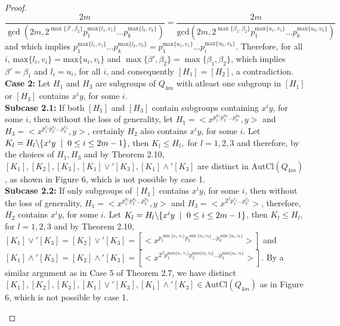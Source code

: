 \documentclass{article}
\theoremstyle{definition}
\begin{document}
\begin{proof}
\begin{equation*}
\frac{2m}{\gcd(2m, 2^{\max\{\beta',\beta_2\}}p_1^{\text{max}\{l_1,v_1\}}\dots p_k^{\text{max}\{l_k,v_k\}}   )}=\frac{2m}{\text{gcd}(2m, 2^{\max\{\beta_1,\beta_2\}}p_1^{\text{max}\{u_1,v_1\}}\dots p_k^{\text{max}\{u_k,v_k\}})}
\end{equation*}
and which implies $p_1^{\text{max}\{l_1,v_1\}}\dots p_k^{\text{max}\{l_k,v_k\}}=p_1^{\text{max}\{u_1,v_1\}}\dots p_i^{\text{max}\{u_k,v_k\}}$. Therefore, for all $i$, $\text{max}\{l_i,v_i\}=\text{max}\{u_i,v_i\}$ and $\max\{\beta',\beta_2\}=\max\{\beta_1,\beta_2\}$, which implies $\beta'=\beta_1$ and $l_i=u_i$, for all $i$, and consequently $[H_1]=[H_2]$, a contradiction. \vspace{0.2cm} \\
\textbf{Case 2:} Let $H_1$ and $H_3$ are subgroups of $Q_{4m}$ with atleast one subgroup in $[H_1]$ or $[H_3]$ contains $x^iy$, for some $i$. \vspace{0.2cm}\\
\textbf{Subcase 2.1:} If both $[H_1]$ and $[H_3]$ contain subgroups containing $x^iy$, for some $i$, then without the loss of generality, let $H_1=\bigl<x^{p_1^{u_1}p_2^{u_2}\dots p_k^{u_k}},y\bigr>$ and $H_3=\bigl<x^{p_1^{v_1}p_2^{v_2}\dots p_k^{v_k}},y\bigr>$, certainly $H_2$ also contains $x^iy$, for some $i$. Let $K_l=H_l\backslash\{x^iy\hspace{0.2cm}|\hspace{0.2cm}0\le i \le 2m-1\}$, then $K_l \le H_l,$ for $l=1,2,3$ and therefore, by the choices of $H_1,H_3$ and by Theorem 2.10, $[K_1], [K_2],[K_3],[K_1]\vee' [K_3],[K_1]\wedge' [K_3]$ are distinct in $\text{AutCl}(Q_{4m})$, as shown in Figure 6, which is not possible by case 1. \vspace{0.2cm}\\
\textbf{Subcase 2.2:} If only subgroups of $[H_1]$ contains $x^iy$, for some $i$, then without the loss of generality, $H_1=\bigl<x^{p_1^{u_1}p_2^{u_2}\dots p_k^{u_k}},y\bigr>$ and $H_3=\bigl<x^{2^\beta p_1^{v_1}\dots p_k^{v_k}}\bigr>$, therefore, $H_2$ contains $x^iy$, for some $i$. Let $K_l=H_l\backslash\{x^iy\hspace{0.2cm}|\hspace{0.2cm}0\le i \le 2m-1\}$, then $K_l \le H_l,$ for $l=1,2,3$ and by Theorem 2.10, $[K_1]\vee' [K_3]=[K_2]\vee'[K_3]=[\bigl<x^{p_1^{\min\{u_1,v_1\}}p_2^{\min\{u_2,v_2\}}\dots p_k^{\min\{u_k,v_k\}}}\bigr>]$ and $[K_1]\wedge' [K_3]=[K_2]\wedge'[K_3]=[\bigl<x^{2^{\beta}p_1^{\text{max}\{u_1,v_1\}}p_2^{\text{max}\{u_2,v_2\}}\dots p_k^{\text{max}\{u_k,v_k\}}}\bigr>]$. By a similar argument as in Case 5 of Theorem 2.7, we have distinct $[K_1],[K_2],[K_3],[K_1]\vee'[K_3],[K_1]\wedge' [K_3]\in \text{AutCl}(Q_{4m})$ as in Figure 6, which is not possible by case 1. 
\begin{figure}[h!]
    \centering
    \begin{tikzpicture}[scale=1.5,  every node/.style={circle, fill=black, minimum size=6pt, inner sep=0pt}]
				

\end{tikzpicture}
\end{figure}
\end{proof}
\end{document}
